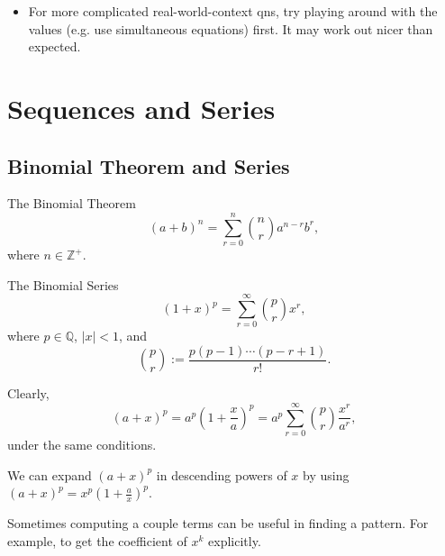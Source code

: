\documentclass[oneside]{book}
\begin{document}
\begin{IN}
\begin{itemize}
    Order is \emph{Preserved} under exponentiation/logarithms if the base is \emph{larger than} one. Otherwise, when it is \emph{less than} one, the order is \emph{reversed}. \url{https://www.desmos.com/calculator/gd8z5fa0bg}
    \item  For more complicated real-world-context qns, try playing around with the values (e.g. use simultaneous equations) first. It may work out nicer than expected.
\end{itemize}
\end{IN}

\chapter{Sequences and Series}
\section{Binomial Theorem and Series}
\begin{theorem}{The Binomial Theorem}{}
  \[(a+b)^n=\sum_{r=0}^{n}{\binom{n}{r}a^{n-r}b^r},\]
  where \(n \in \mathbb{Z}^{+}\).
\end{theorem}
\begin{theorem}{The Binomial Series}{}
  \[(1+x)^{p}=\sum_{r=0}^{\infty}{\binom{p}{r}x^r},\]
  where \(p \in \mathbb{Q}\), \(\lvert x \rvert<1\), and
  \[\binom{p}{r}:=\frac{p(p-1)\cdots(p-r+1)}{r!}.\]
\end{theorem}
\begin{corollary}{}{}
  Clearly,
  \[(a+x)^p=a^p\left(1+\frac{x}{a}\right)^p=a^p \sum_{r=0}^{\infty}{\binom{p}{r}\frac{x^r}{a^r}},\]
  under the same conditions.
\end{corollary}
\begin{fact}
  We can expand \((a+x)^p\) in descending powers of \(x\) by using \((a+x)^p=x^p\left(1+\frac{a}{x}\right)^p\).
\end{fact}
\begin{note}
  Sometimes computing a couple terms can be useful in finding a pattern. For example, to get the coefficient of \(x^k\) explicitly.
\end{note}
\newpage
\end{document}
